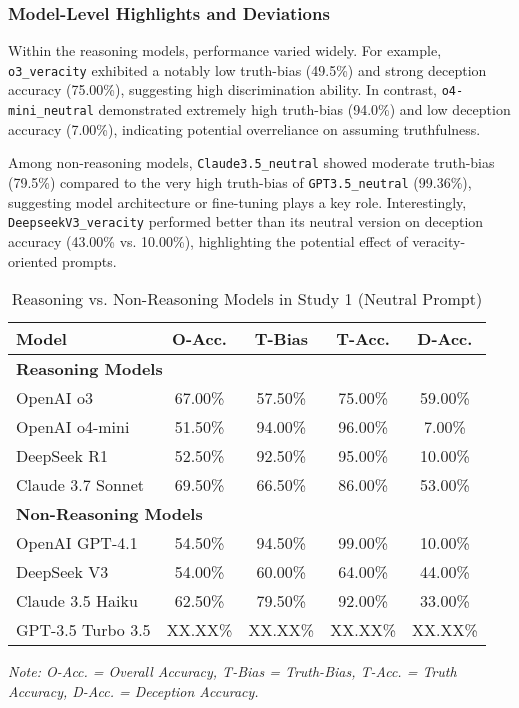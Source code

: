 \documentclass{article}
\begin{document}
\subsubsection{Model-Level Highlights and Deviations}

Within the reasoning models, performance varied widely. For example, \texttt{o3\_veracity} exhibited a notably low truth-bias (49.5\%) and strong deception accuracy (75.00\%), suggesting high discrimination ability. In contrast, \texttt{o4-mini\_neutral} demonstrated extremely high truth-bias (94.0\%) and low deception accuracy (7.00\%), indicating potential overreliance on assuming truthfulness.

Among non-reasoning models, \texttt{Claude3.5\_neutral} showed moderate truth-bias (79.5\%) compared to the very high truth-bias of \texttt{GPT3.5\_neutral} (99.36\%), suggesting model architecture or fine-tuning plays a key role. Interestingly, \texttt{DeepseekV3\_veracity} performed better than its neutral version on deception accuracy (43.00\% vs. 10.00\%), highlighting the potential effect of veracity-oriented prompts.

\begin{table}[ht]
\centering
\caption{Reasoning vs. Non-Reasoning Models in Study 1 (Neutral Prompt)}
\begin{tabular}{lcccc}
\toprule
\textbf{Model} & \textbf{O-Acc.} & \textbf{T-Bias} & \textbf{T-Acc.} & \textbf{D-Acc.} \\
\midrule
\multicolumn{5}{l}{\textbf{Reasoning Models}} \\
OpenAI o3 & 67.00\% & 57.50\% & 75.00\% & 59.00\% \\
OpenAI o4-mini & 51.50\% & 94.00\% & 96.00\% & 7.00\% \\
DeepSeek R1 & 52.50\% & 92.50\% & 95.00\% & 10.00\% \\
Claude 3.7 Sonnet & 69.50\% & 66.50\% & 86.00\% & 53.00\% \\
\midrule
\multicolumn{5}{l}{\textbf{Non-Reasoning Models}} \\
OpenAI GPT-4.1 & 54.50\% & 94.50\% & 99.00\% & 10.00\% \\
DeepSeek V3 & 54.00\% & 60.00\% & 64.00\% & 44.00\% \\
Claude 3.5 Haiku & 62.50\% & 79.50\% & 92.00\% & 33.00\% \\
GPT-3.5 Turbo 3.5 & XX.XX\% & XX.XX\% & XX.XX\% & XX.XX\% \\
\bottomrule
\end{tabular}
\begin{minipage}{0.7\linewidth}
\vspace{0.05in}
\footnotesize
\textit{Note: O-Acc. = Overall Accuracy, T-Bias = Truth-Bias, T-Acc. = Truth Accuracy, D-Acc. = Deception Accuracy.}
\end{minipage}
\label{tab:study1_model_comparison}
\end{table}
\end{document}
